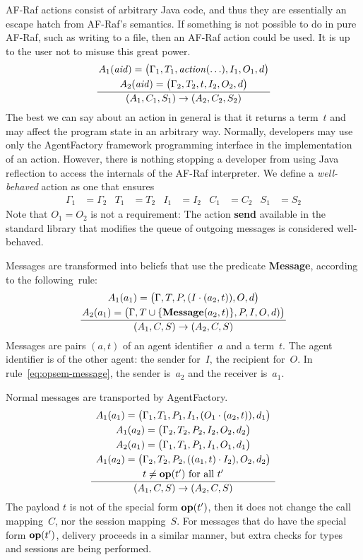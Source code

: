 \documentclass[a4paper,12pt,oneside,fleqn]{book} %
\newcommand{\on}[2]{\genfrac{}{}{0pt}{0}{\strut#1}{\strut#2}}
\begin{document}
AF-Raf actions consist of arbitrary Java code, and thus they are
essentially an escape hatch from AF-Raf's semantics. If something is not
possible to do in pure AF-Raf, such as writing to a file, then an AF-Raf
action could be used. It is up to the user not to misuse this great power.
\begin{align}
\frac
  {\on{A_1({\it aid})=\bigl(\Gamma_1,T_1,{\it action}(\ldots),I_1,O_1,d\bigr)}
      {A_2({\it aid})=\bigl(\Gamma_2,T_2,t,I_2,O_2,d\bigr)}}
  {(A_1,C_1,S_1)\to(A_2,C_2,S_2)}
\end{align}
The best we can say about an action in general is that it returns a
term~$t$ and may affect the program state in an arbitrary way. Normally,
developers may use only the AgentFactory framework programming interface in
the implementation of an action. However, there is nothing stopping a
developer from using Java reflection to access the internals of the AF-Raf
interpreter.  We define a \emph{well-behaved} action as one that ensures
\begin{align}
\Gamma_1&=\Gamma_2  & T_1&=T_2 & I_1&=I_2 & C_1 &=C_2 & S_1&=S_2
\end{align}
Note that $O_1=O_2$ is not a requirement: The action {\bf send} available
in the standard library that modifies the queue of outgoing messages is
considered well-behaved.

Messages are transformed into beliefs that use the predicate {\bf Message},
according to the following~rule:
\begin{align}
\frac
  {\on{A_1(a_1)=\bigl(\Gamma,T,P,(I\cdot(a_2,t)),O,d\bigr)}
      {A_2(a_1)=\bigl(\Gamma,T\cup\{{\bf Message}(a_2,t)\},P,I,O,d)\bigr)}}
  {(A_1,C,S)\to(A_2,C,S)}
  \label{eq:opsem-message}
\end{align}
Messages are pairs $(a,t)$ of an agent identifier~$a$ and a term~$t$. The
agent identifier is of the other agent: the sender for~$I$, the recipient
for~$O$. In rule~\eqref{eq:opsem-message}, the sender is~$a_2$ and the
receiver is~$a_1$.

Normal messages are transported by AgentFactory.
\begin{align}
\frac
  {\on{A_1(a_1)=\bigl(\Gamma_1,T_1,P_1,I_1,(O_1\cdot(a_2,t)),d_1\bigr)}
  {\on{A_1(a_2)=\bigl(\Gamma_2,T_2,P_2,I_2,O_2,d_2\bigr)}
  {\on{A_2(a_1)=\bigl(\Gamma_1,T_1,P_1,I_1,O_1,d_1\bigr)}
  {\on{A_1(a_2)=\bigl(\Gamma_2,T_2,P_2,((a_1,t)\cdot I_2),O_2,d_2\bigr)}
      {\text{$t\ne{\bf op}(t')$ for all $t'$}}}}}}
  {(A_1,C,S)\to(A_2,C,S)}
  \label{eq:opsem-msg-nonop}
\end{align}
The payload $t$ is not of the special form ${\bf op}(t')$, then it does not
change the call mapping~$C$, nor the session mapping~$S$. For messages that
do have the special form ${\bf op}(t')$, delivery proceeds in a similar
manner, but extra checks for types and sessions are being performed.
\end{document}
